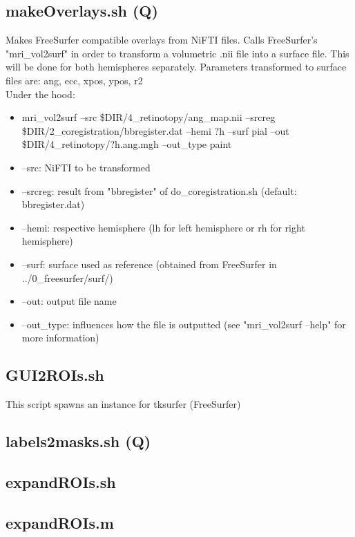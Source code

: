 \documentclass[12pt,a4paper]{scrartcl}
\begin{document}
\subsection{makeOverlays.sh (Q)}
\label{sec:mkOver}
Makes FreeSurfer compatible overlays from NiFTI files. Calls FreeSurfer's "mri\_vol2surf" in order to transform a volumetric .nii file into a surface file. This will be done for both hemispheres separately. Parameters transformed to surface files are: ang, ecc, xpos, ypos, r2\\

\noindent Under the hood:
\begin{itemize}
\item mri\_vol2surf --src \$DIR/4\_retinotopy/ang\_map.nii  --srcreg \$DIR/2\_coregistration/bbregister.dat --hemi ?h --surf pial --out \$DIR/4\_retinotopy/?h.ang.mgh --out\_type paint
\item --src: NiFTI to be transformed
\item --srcreg: result from "bbregister" of do\_coregistration.sh (default: bbregister.dat)
\item --hemi: respective hemisphere (lh for left hemisphere or rh for right hemisphere)
\item --surf: surface used as reference (obtained from FreeSurfer in ../0\_freesurfer/surf/)
\item --out: output file name
\item --out\_type: influences how the file is outputted (see "mri\_vol2surf --help" for more information)
\end{itemize}

\subsection{GUI2ROIs.sh}
\label{sec:GUI2ROI}
This script spawns an instance for tksurfer (FreeSurfer)

\subsection{labels2masks.sh (Q)}
\label{sec:lbl2msk}

\subsection{expandROIs.sh}
\label{sec:expROI}

\subsection{expandROIs.m}
\end{document}

